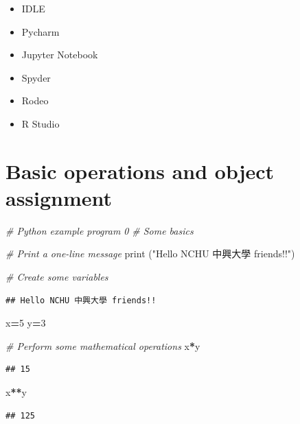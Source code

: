 \documentclass[]{book}
\newenvironment{Shaded}{\begin{snugshade}}{\end{snugshade}}
\newcommand{\BuiltInTok}[1]{#1}
\newcommand{\CommentTok}[1]{\textcolor[rgb]{0.56,0.35,0.01}{\textit{#1}}}
\newcommand{\DecValTok}[1]{\textcolor[rgb]{0.00,0.00,0.81}{#1}}
\newcommand{\NormalTok}[1]{#1}
\newcommand{\OperatorTok}[1]{\textcolor[rgb]{0.81,0.36,0.00}{\textbf{#1}}}
\newcommand{\StringTok}[1]{\textcolor[rgb]{0.31,0.60,0.02}{#1}}
\providecommand{\tightlist}{%
  \setlength{\itemsep}{0pt}\setlength{\parskip}{0pt}}
\begin{document}
\begin{itemize}
\tightlist
\item
  IDLE
\item
  Pycharm
\item
  Jupyter Notebook
\item
  Spyder
\item
  Rodeo
\item
  R Studio
\end{itemize}

\hypertarget{basic-operations-and-object-assignment-1}{%
\section{Basic operations and object assignment}\label{basic-operations-and-object-assignment-1}}

\begin{Shaded}
\begin{Highlighting}[]
\CommentTok{# Python example program 0}
\CommentTok{# Some basics}

\CommentTok{# Print a one-line message}
\BuiltInTok{print}\NormalTok{ (}\StringTok{"Hello NCHU 中興大學 friends!!"}\NormalTok{)}

\CommentTok{# Create some variables}
\end{Highlighting}
\end{Shaded}

\begin{verbatim}
## Hello NCHU 中興大學 friends!!
\end{verbatim}

\begin{Shaded}
\begin{Highlighting}[]
\NormalTok{x}\OperatorTok{=}\DecValTok{5}
\NormalTok{y}\OperatorTok{=}\DecValTok{3}

\CommentTok{# Perform some mathematical operations}
\NormalTok{x}\OperatorTok{*}\NormalTok{y}
\end{Highlighting}
\end{Shaded}

\begin{verbatim}
## 15
\end{verbatim}

\begin{Shaded}
\begin{Highlighting}[]
\NormalTok{x}\OperatorTok{**}\NormalTok{y}
\end{Highlighting}
\end{Shaded}

\begin{verbatim}
## 125
\end{verbatim}
\end{document}
